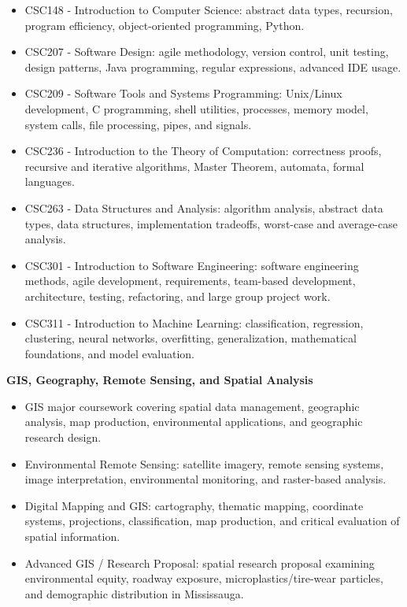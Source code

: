 \documentclass[10.5pt,letterpaper]{article}
\begin{document}
\begin{itemize}
\item CSC148 - Introduction to Computer Science: abstract data types, recursion, program efficiency, object-oriented programming, Python.
\item CSC207 - Software Design: agile methodology, version control, unit testing, design patterns, Java programming, regular expressions, advanced IDE usage.
\item CSC209 - Software Tools and Systems Programming: Unix/Linux development, C programming, shell utilities, processes, memory model, system calls, file processing, pipes, and signals.
\item CSC236 - Introduction to the Theory of Computation: correctness proofs, recursive and iterative algorithms, Master Theorem, automata, formal languages.
\item CSC263 - Data Structures and Analysis: algorithm analysis, abstract data types, data structures, implementation tradeoffs, worst-case and average-case analysis.
\item CSC301 - Introduction to Software Engineering: software engineering methods, agile development, requirements, team-based development, architecture, testing, refactoring, and large group project work.
\item CSC311 - Introduction to Machine Learning: classification, regression, clustering, neural networks, overfitting, generalization, mathematical foundations, and model evaluation.
\end{itemize}
\textbf{GIS, Geography, Remote Sensing, and Spatial Analysis}\par
\begin{itemize}
\item GIS major coursework covering spatial data management, geographic analysis, map production, environmental applications, and geographic research design.
\item Environmental Remote Sensing: satellite imagery, remote sensing systems, image interpretation, environmental monitoring, and raster-based analysis.
\item Digital Mapping and GIS: cartography, thematic mapping, coordinate systems, projections, classification, map production, and critical evaluation of spatial information.
\item Advanced GIS / Research Proposal: spatial research proposal examining environmental equity, roadway exposure, microplastics/tire-wear particles, and demographic distribution in Mississauga.
\end{itemize}
\end{document}
